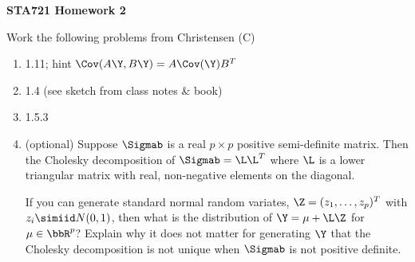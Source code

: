 \documentclass[12pt]{article}
\begin{document}
{\bf STA721 \hfill Homework 2}

\vspace{.5in}
\noindent
Work the following problems from Christensen (C)
\begin{enumerate}
\item 1.11;  hint $\Cov(A \Y, B\Y) = A \Cov(\Y) B^T$
\item 1.4  (see sketch from class notes \& book)
\item 1.5.3  
\item (optional) Suppose $\Sigmab$ is a real $p \times p$ positive semi-definite
  matrix.  Then the Cholesky decomposition of 
  $\Sigmab = \L \L^T$ where $\L$ is a lower triangular matrix with
  real, non-negative elements on the diagonal.

  If you can generate standard normal random variates, $\Z = (z_1,
  \ldots, z_p)^T$ with $z_i \simiid N(0,1)$, then what is the
  distribution of $\Y = \mu + \L \Z$ for $\mu \in \bbR^p$?   Explain why it
  does not matter for generating $\Y$ that the Cholesky decomposition is
  not unique when $\Sigmab$ is not positive definite.

\end{enumerate}
\end{document}
